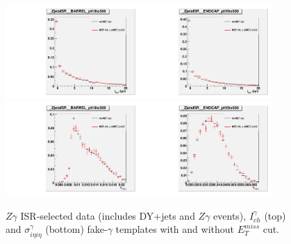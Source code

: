 \begin{figure}[htb]
  \begin{center}
  \includegraphics[width=0.45\textwidth]{../figs/figs_v11/ChannelsMERGED_ZGamma/QuickChecks/cTemplatesVsWMt_ZjetsISR_phoPFChIsoCorr_BARREL_pt10to500.pdf}\includegraphics[width=0.45\textwidth]{../figs/figs_v11/ChannelsMERGED_ZGamma/QuickChecks/cTemplatesVsWMt_ZjetsISR_phoPFChIsoCorr_ENDCAP_pt10to500.pdf}\\
  \includegraphics[width=0.45\textwidth]{../figs/figs_v11/ChannelsMERGED_ZGamma/QuickChecks/cTemplatesVsWMt_ZjetsISR_phoSigmaIEtaIEta_BARREL_pt10to500.pdf}\includegraphics[width=0.45\textwidth]{../figs/figs_v11/ChannelsMERGED_ZGamma/QuickChecks/cTemplatesVsWMt_ZjetsISR_phoSigmaIEtaIEta_ENDCAP_pt10to500.pdf}\\
  \caption{$Z\gamma$ ISR-selected data (includes DY+jets and $Z\gamma$ events), $I_{ch}^\gamma$ (top) and $\sigma_{i \eta i \eta}^\gamma$ (bottom) fake-$\gamma$ templates with and without $E_T^{miss}$ cut.}
  \label{fig:templatesVsWMt_Zg_CHISO_fake}
  \end{center}
\end{figure}

